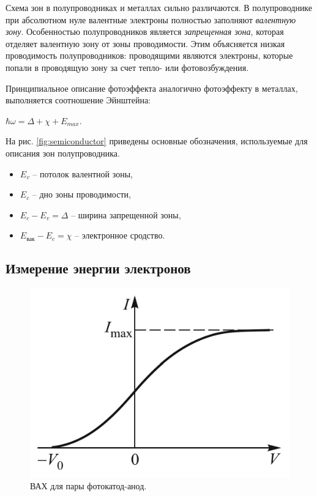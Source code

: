 \documentclass[a4paper, 12pt]{article} %
\begin{document}
	Схема зон в полупроводниках и металлах сильно различаются. В полупроводнике при абсолютном нуле валентные электроны полностью заполняют \textit{валентную зону}. Особенностью полупроводников является \textit{запрещенная зона}, которая отделяет валентную зону от зоны проводимости. Этим объясняется низкая проводимость полупроводников: проводящими являются электроны, которые попали в проводящую зону за счет тепло- или фотовозбуждения.
	
	Принципиальное описание фотоэффекта аналогично фотоэффекту в металлах, выполняется соотношение Эйнштейна: 
	
	\begin{center}
		$\hbar \omega = \Delta + \chi + E_{max}$.
	\end{center}
	
	На рис. \ref{fig:semiconductor} приведены основные обозначения, используемые для описания зон полупроводника.
	
	\begin{itemize}
		\item $E_v$ -- потолок валентной зоны,
		\item $E_c$ -- дно зоны проводимости,
		\item $E_c - E_v = \Delta$ -- ширина запрещенной зоны,
		\item $E_{\text{вак}} - E_c = \chi$ -- электронное сродство.
	\end{itemize}
	
	\newpage
		
	\subsection{Измерение энергии электронов}
	\begin{figure}
		\includegraphics[scale=0.3]{res/iv_curve.png}
		\caption{ВАХ для пары фотокатод-анод.}
		\label{fig:iv_curve}
		\vspace{-10pt}
	\end{figure}
\end{document}

